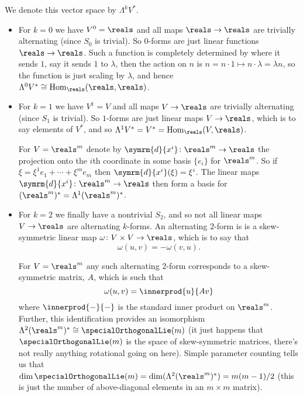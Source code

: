 \documentclass[fleqn]{NotesClass}
\renewcommand{\dl}{\symrm{d}}
\newcommand{\isomorphic}{\cong}
\DeclareMathOperator{\Hom}{Hom}
\begin{document}
    We denote this vector space by \(\Lambda^k V^*\).
    
    \begin{exm}{}{}
        \begin{itemize}
            \item For \(k = 0\) we have \(V^0 = \reals\) and all maps \(\reals \to \reals\) are trivially alternating (since \(S_0\) is trivial).
            So \(0\)-forms are just linear functions \(\reals \to \reals\).
            Such a function is completely determined by where it sends \(1\), say it sends \(1\) to \(\lambda\), then the action on \(n\) is \(n = n \cdot 1 \mapsto n \cdot \lambda = \lambda n\), so the function is just scaling by \(\lambda\), and hence \(\Lambda^0 V^* \isomorphic \Hom_{\reals}(\reals, \reals)\).
            \item For \(k = 1\) we have \(V^1 = V\) and all maps \(V \to \reals\) are trivially alternating (since \(S_1\) is trivial).
            So \(1\)-forms are just linear maps \(V \to \reals\), which is to say elements of \(V^*\), and so \(\Lambda^1 V^* = V^* = \Hom_{\reals}(V, \reals)\).
            
            For \(V = \reals^m\) denote by \(\dl{x^i} \colon \reals^m \to \reals\) the projection onto the \(i\)th coordinate in some basis \(\{e_i\}\) for \(\reals^m\).
            So if \(\xi = \xi^1 e_1 + \dotsb + \xi^m e_m\) then \(\dl{x^i}(\xi) = \xi^i\).
            The linear maps \(\dl{x^i} \colon \reals^m \to \reals\) then form a basis for \((\reals^m)^* = \Lambda^1(\reals^m)^*\).
            
            \item For \(k = 2\) we finally have a nontrivial \(S_2\), and so not all linear maps \(V \to \reals\) are alternating \(k\)-forms.
            An alternating \(2\)-form is is a skew-symmetric linear map \(\omega \colon V \times V \to \reals\), which is to say that
            \begin{equation}
                \omega(u, v) = -\omega(v, u).
            \end{equation}
            
            For \(V = \reals^m\) any such alternating \(2\)-form corresponds to a skew-symmetric matrix, \(A\), which is such that
            \begin{equation}
                \omega(u, v) = \innerprod{u}{Av}
            \end{equation}
            where \(\innerprod{-}{-}\) is the standard inner product on \(\reals^m\).
            Further, this identification provides an isomorphism \(\Lambda^2(\reals^m)^* \isomorphic \specialOrthogonalLie(m)\) (it just happens that \(\specialOrthogonalLie(m)\) is the space of skew-symmetric matrices, there's not really anything rotational going on here).
            Simple parameter counting tells us that \(\dim \specialOrthogonalLie(m) = \dim(\Lambda^2(\reals^m)^*) = m(m - 1)/2\) (this is just the number of above-diagonal elements in an \(m \times m\) matrix).
        \end{itemize}
    \end{exm}
    
\end{document}
